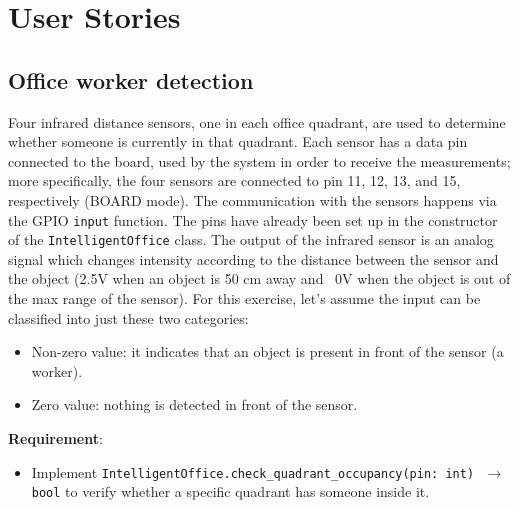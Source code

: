 \section{User Stories}
\subsection{Office worker detection}
Four infrared distance sensors, one in each office quadrant, are used to determine whether someone is currently in that quadrant.
Each sensor has a data pin connected to the board, used by the system in order to receive the measurements; more specifically, the four sensors are connected to pin 11, 12, 13, and 15, respectively (BOARD mode).
The communication with the sensors happens via the GPIO \texttt{input} function. The pins have already been set up in the constructor of the \texttt{IntelligentOffice} class. 
The output of the infrared sensor is an analog signal which changes intensity according to the distance between the sensor and the object (\ie 2.5V when an object is 50 cm away and ~0V when the object is out of the max range of the sensor). For this exercise, let's assume the input can be classified into just these two categories:
\begin{itemize}
    \item Non-zero value: it indicates that an object is present in front of the sensor (\ie a worker).
    \item Zero value: nothing is detected in front of the sensor.
\end{itemize}

\noindent\textbf{Requirement}:
\begin{itemize}
    \item Implement \texttt{IntelligentOffice.check\_quadrant\_occupancy(pin: int) $\,\to\,$ bool} to verify whether a specific quadrant has someone inside it.
\end{itemize}


